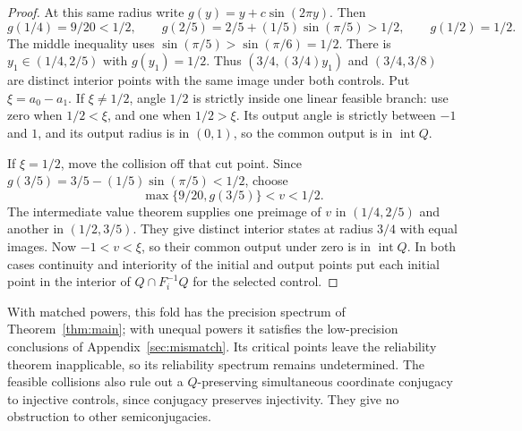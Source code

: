 \documentclass[11pt]{amsart}
\theoremstyle{definition}
\theoremstyle{remark}
\numberwithin{equation}{section}
\begin{document}
\begin{proof}
At this same radius write $g(y)=y+c\sin(2\pi y)$. Then
\[
g(1/4)=9/20<1/2,\qquad
g(2/5)=2/5+(1/5)\sin(\pi/5)>1/2,\qquad g(1/2)=1/2.
\]
The middle inequality uses $\sin(\pi/5)>\sin(\pi/6)=1/2$.
There is $y_1\in(1/4,2/5)$ with $g(y_1)=1/2$.
Thus $(3/4,(3/4)y_1)$ and $(3/4,3/8)$ are distinct interior
points with the same image under both controls. Put $\xi=a_0-a_1$.
If $\xi\ne1/2$, angle $1/2$ is strictly inside one linear
feasible branch: use zero when $1/2<\xi$, and one when $1/2>\xi$.
Its output angle is strictly between $-1$ and $1$, and its
output radius is in $(0,1)$, so the common output is in
$\operatorname{int}Q$.

If $\xi=1/2$, move the collision off that cut point.
Since $g(3/5)=3/5-(1/5)\sin(\pi/5)<1/2$, choose
\[
\max\{9/20,g(3/5)\}<v<1/2.
\]
The intermediate value theorem supplies one preimage of $v$
in $(1/4,2/5)$ and another in $(1/2,3/5)$. They give distinct
interior states at radius $3/4$ with equal images. Now
$-1<v<\xi$, so their common output under zero is in
$\operatorname{int}Q$. In both cases continuity and interiority
of the initial and output points put each initial point in the
interior of $Q\cap F_i^{-1}Q$ for the selected control.
\end{proof}

With matched powers, this fold has the precision spectrum of
Theorem~\ref{thm:main}; with unequal powers it satisfies the
low-precision conclusions of Appendix~\ref{sec:mismatch}.
Its critical points leave the reliability theorem inapplicable,
so its reliability spectrum remains undetermined. The feasible
collisions also rule out a $Q$-preserving simultaneous coordinate
conjugacy to injective controls, since conjugacy preserves
injectivity. They give no obstruction to other semiconjugacies.
\end{document}
